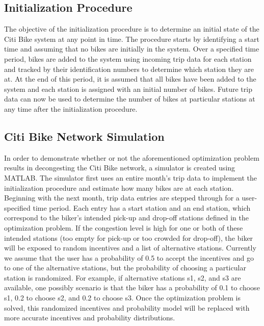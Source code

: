 \documentclass[times, 10pt,twocolumn]{article}
\begin{document}
\subsection{Initialization Procedure}
The objective of the initialization procedure is to determine an initial state of the Citi Bike system at any point in time. The procedure starts by identifying a start time and assuming that no bikes are initially in the system. Over a specified time period, bikes are added to the system using incoming trip data for each station and tracked by their identification numbers to determine which station they are at. At the end of this period, it is assumed that all bikes have been added to the system and each station is assigned with an initial number of bikes. Future trip data can now be used to determine the number of bikes at particular stations at any time after the initialization procedure.

\subsection{Citi Bike Network Simulation}

In order to demonstrate whether or not the aforementioned optimization problem results in decongesting the Citi Bike network, a simulator is created using MATLAB. The simulator first uses an entire month's trip data to implement the initialization procedure and estimate how many bikes are at each station. Beginning with the next month, trip data entries are stepped through for a user-specified time period. Each entry has a start station and an end station, which correspond to the biker's intended pick-up and drop-off stations defined in the optimization problem. If the congestion level is high for one or both of these intended stations (too empty for pick-up or too crowded for drop-off), the biker will be exposed to random incentives and a list of alternative stations. Currently we assume that the user has a probability of 0.5 to accept the incentives and go to one of the alternative stations, but the probability of choosing a particular station is randomized. For example, if alternative stations s1, s2, and s3 are available, one possibly scenario is that the biker has a probability of 0.1 to choose s1, 0.2 to choose s2, and 0.2 to choose s3. Once the optimization problem is solved, this randomized incentives and probability model will be replaced with more accurate incentives and probability distributions.
\end{document}
